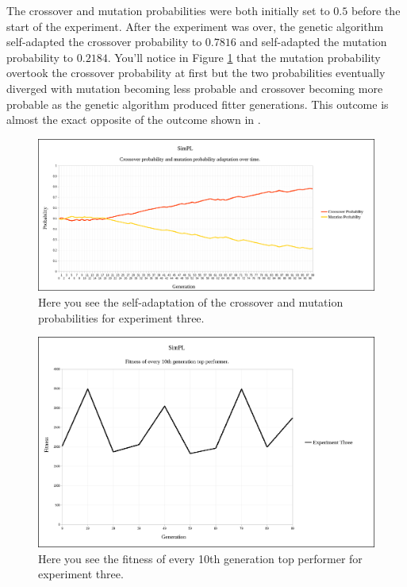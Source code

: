 \documentclass[a4paper,10pt]{article}
\begin{document}
The crossover and mutation probabilities were both initially set to $0.5$ before the start of the experiment. After the experiment was over, the genetic algorithm self-adapted the crossover probability to $0.7816$ and self-adapted the mutation probability to $0.2184$. You'll notice in Figure \ref{fig:exp3_self_adapt} that the mutation probability overtook the crossover probability at first but the two probabilities eventually diverged with mutation becoming less probable and crossover becoming more probable as the genetic algorithm produced fitter generations. This outcome is almost the exact opposite of the outcome shown in \cite{self_adapt}.

\begin{figure}[H]  
  \centering
  \includegraphics[width=1\textwidth]{figures/exp3_self_adapt.png}
  \caption{Here you see the self-adaptation of the crossover and mutation probabilities for experiment three.}
  \label{fig:exp3_self_adapt}
\end{figure}

\begin{figure}[H]  
  \centering
  \includegraphics[width=1\textwidth]{figures/exp3_10_tops.png}
  \caption{Here you see the fitness of every 10th generation top performer for experiment three.}
  \label{fig:exp3_10_tops}
\end{figure}
\end{document}
